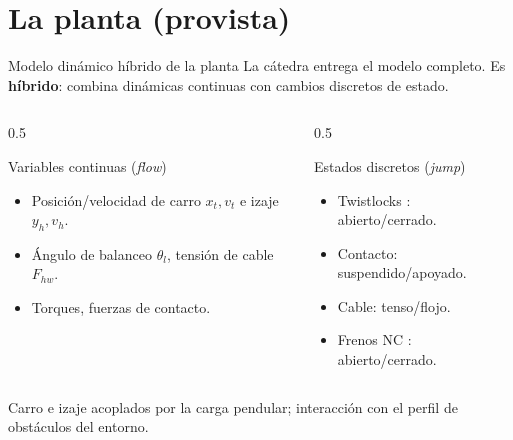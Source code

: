 \section{La planta (provista)}

\begin{frame}{Modelo dinámico híbrido de la planta}
  La cátedra entrega el modelo completo. Es \textbf{híbrido}: combina dinámicas continuas con
  cambios discretos de estado.
  \begin{columns}[T]
    \begin{column}{0.5\textwidth}
      \begin{block}{Variables continuas (\textit{flow})}
        \begin{itemize}
          \item Posición/velocidad de carro $x_t,v_t$ e izaje $y_h,v_h$.
          \item Ángulo de balanceo $\theta_l$, tensión de cable $F_{hw}$.
          \item Torques, fuerzas de contacto.
        \end{itemize}
      \end{block}
    \end{column}
    \begin{column}{0.5\textwidth}
      \begin{block}{Estados discretos (\textit{jump})}
        \begin{itemize}
          \item Twistlocks : abierto/cerrado.
          \item Contacto: suspendido/apoyado.
          \item Cable: tenso/flojo.
          \item Frenos NC : abierto/cerrado.
        \end{itemize}
      \end{block}
    \end{column}
  \end{columns}
  \vspace{0.3cm}
  \centering
  \footnotesize Carro e izaje acoplados por la carga pendular; interacción con el perfil de
  obstáculos del entorno.
\end{frame}

